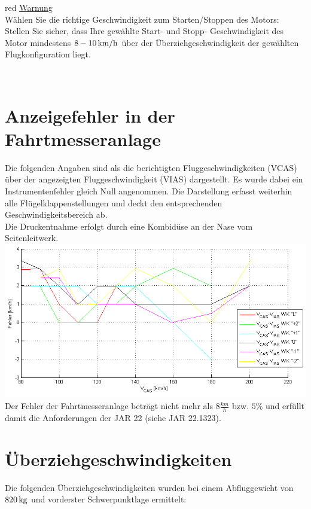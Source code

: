 \begin{color}{red}
\large{\underline{Warnung}}\\
Wählen Sie die richtige Geschwindigkeit zum Starten/Stoppen des Motors: \\
Stellen Sie sicher, dass Ihre gewählte Start- und Stopp- Geschwindigkeit des Motor mindestens $\unit[8-10]{km/h}$ über der Überziehgeschwindigkeit der gewählten Flugkonfiguration liegt.
\end{color}\\
\newpage
\section{Anzeigefehler in der Fahrtmesseranlage}
Die folgenden Angaben sind als die berichtigten Fluggeschwindigkeiten (VCAS) über der angezeigten Fluggeschwindigkeit (VIAS) dargestellt. Es wurde dabei ein Instrumentenfehler gleich Null angenommen. Die Darstellung erfasst weiterhin alle Flügelklappenstellungen und deckt den entsprechenden Geschwindigkeitsbereich ab.\\
\newline
Die Druckentnahme erfolgt durch eine Kombidüse an der Nase vom Seitenleitwerk.\\
\newline
\includegraphics[width=.9\textwidth]{fahrtmesserkalibrierung.png}
\newline
Der Fehler der Fahrtmesseranlage beträgt nicht mehr als $8 \frac{km}{h}$ bzw. $5\%$ und erfüllt damit die Anforderungen der JAR 22 (siehe JAR 22.1323).

\section{Überziehgeschwindigkeiten}

Die folgenden Überziehgeschwindigkeiten wurden bei einem Abfluggewicht von $\unit[820]{kg}$ und vorderster Schwerpunktlage ermittelt:

